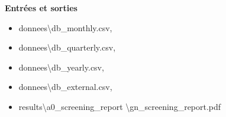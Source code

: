     {\bf Entrées et sorties}
    \begin{itemize}
        \item[\textrightarrow] {\color{magenta}donnees\textbackslash db\_monthly.csv},
        \item[\textrightarrow] {\color{magenta}donnees\textbackslash db\_quarterly.csv},
        \item[\textrightarrow] {\color{magenta}donnees\textbackslash db\_yearly.csv},
        \item[\textrightarrow] {\color{magenta}donnees\textbackslash db\_external.csv},
        \item[\textleftarrow] {\color{magenta}results\textbackslash a0\_screening\_report \textbackslash gn\_screening\_report.pdf}
    \end{itemize}
    
